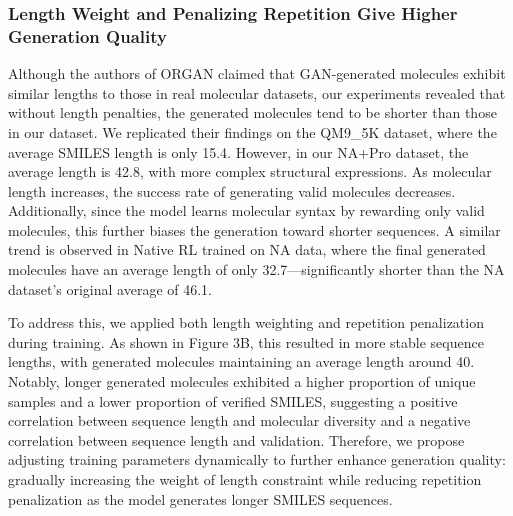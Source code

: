 \documentclass[10pt, twocolumn]{article}
\begin{document}


\subsubsection*{Length Weight and Penalizing Repetition Give Higher Generation Quality}

Although the authors of ORGAN claimed that GAN-generated molecules exhibit similar lengths to those in real molecular datasets, our experiments revealed that without length penalties, the generated molecules tend to be shorter than those in our dataset. We replicated their findings on the QM9\_5K dataset, where the average SMILES length is only 15.4. However, in our NA+Pro dataset, the average length is 42.8, with more complex structural expressions. As molecular length increases, the success rate of generating valid molecules decreases. Additionally, since the model learns molecular syntax by rewarding only valid molecules, this further biases the generation toward shorter sequences. A similar trend is observed in Native RL trained on NA data, where the final generated molecules have an average length of only 32.7—significantly shorter than the NA dataset’s original average of 46.1.

To address this, we applied both length weighting and repetition penalization during training. As shown in Figure 3B, this resulted in more stable sequence lengths, with generated molecules maintaining an average length around 40. Notably, longer generated molecules exhibited a higher proportion of unique samples and a lower proportion of verified SMILES, suggesting a positive correlation between sequence length and molecular diversity and a negative correlation between sequence length and validation. Therefore, we propose adjusting training parameters dynamically to further enhance generation quality: gradually increasing the weight of length constraint while reducing repetition penalization as the model generates longer SMILES sequences. 
\end{document}
